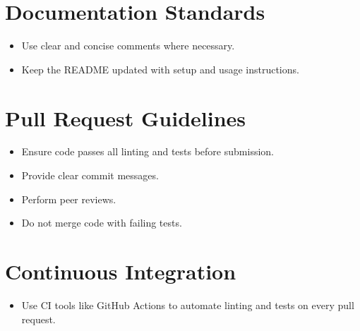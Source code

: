 \documentclass[a4paper,12pt]{article}
\begin{document}
\section{Documentation Standards}
\begin{itemize}
\item Use clear and concise comments where necessary.
\item Keep the README updated with setup and usage instructions.
\end{itemize}

\section{Pull Request Guidelines}
\begin{itemize}
\item Ensure code passes all linting and tests before submission.
\item Provide clear commit messages.
\item Perform peer reviews.
\item Do not merge code with failing tests.
\end{itemize}

\section{Continuous Integration}
\begin{itemize}
\item Use CI tools like GitHub Actions to automate linting and tests on every pull request.
\end{itemize}
\end{document}
